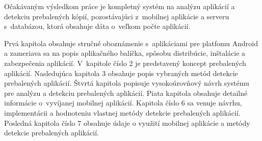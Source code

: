 Očakávaným výsledkom práce je kompletný systém na analýzu aplikácií a detekciu prebalených kópií, pozostávajúci z~mobilnej aplikácie a serveru s~databázou, ktorá obsahuje dáta o~veľkom počte aplikácií.

Prvá kapitola obsahuje stručné oboznámenie s~aplikáciami pre platfomu Android a zameriava sa na popis aplikačného balíčka, spôsobu distribúcie, inštalácie a zabezpečenia aplikácií. V~kapitole číslo 2 je predstavený koncept prebalených aplikácií. Nasledujúca kapitola 3 obsahuje popis vybraných metód detekcie prebalených aplikácií. Štvrtá kapitola popisuje vysokoúrovňový návrh systému pre analýzu a detekciu prebalených aplikácií. Piata kapitola obsahuje detailné informácie o~vyvíjanej mobilnej aplikácií. Kapitola číslo 6 sa venuje návrhu, implementácii a hodnoteniu vlastnej metódy detekcie prebalených aplikácií. Posledná kapitola číslo 7 obsahuje údaje o využití mobilnej aplikácie a metódy detekcie prebalených aplikácií.
